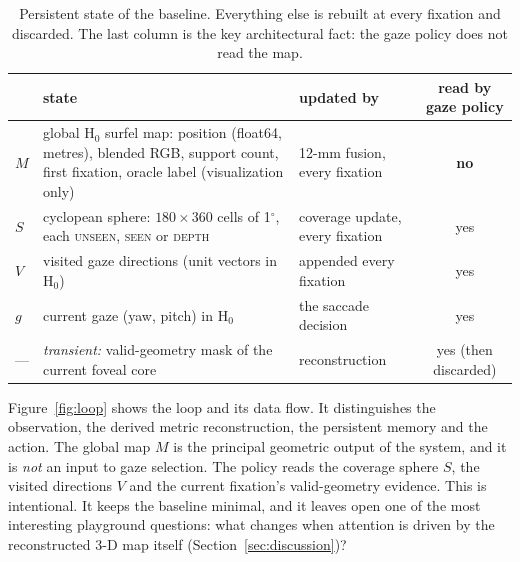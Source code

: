 \documentclass[11pt,a4paper]{article}
\newcommand{\Hz}{\ensuremath{\mathrm{H}_0}}
\newcommand{\degr}{\ensuremath{^\circ}}
\begin{document}
\begin{table}[h]
\centering\small
\caption{Persistent state of the baseline. Everything else is rebuilt at every fixation and discarded. The last
column is the key architectural fact: the gaze policy does not read the map.}
\label{tab:state}
\begin{tabularx}{\linewidth}{@{}l X l c@{}}
\toprule
& state & updated by & read by gaze policy \\
\midrule
$M$ & global \Hz{} surfel map: position (float64, metres), blended RGB, support count, first fixation, oracle label
      (visualization only) & 12-mm fusion, every fixation & \textbf{no} \\
$S$ & cyclopean sphere: $180\times360$ cells of 1\degr{}, each \textsc{unseen}, \textsc{seen} or \textsc{depth} &
      coverage update, every fixation & yes \\
$V$ & visited gaze directions (unit vectors in \Hz{}) & appended every fixation & yes \\
$g$ & current gaze (yaw, pitch) in \Hz{} & the saccade decision & yes \\
\midrule
--- & \emph{transient:} valid-geometry mask of the current foveal core & reconstruction & yes (then discarded) \\
\bottomrule
\end{tabularx}
\end{table}

Figure~\ref{fig:loop} shows the loop and its data flow. It distinguishes the observation, the derived metric
reconstruction, the persistent memory and the action. The global map $M$ is the principal geometric output of the
system, and it is \emph{not} an input to gaze selection. The policy reads the coverage sphere $S$, the visited
directions $V$ and the current fixation's valid-geometry evidence. This is intentional. It keeps the baseline minimal,
and it leaves open one of the most interesting playground questions: what changes when attention is driven by the
reconstructed 3-D map itself (Section~\ref{sec:discussion})?
\end{document}
